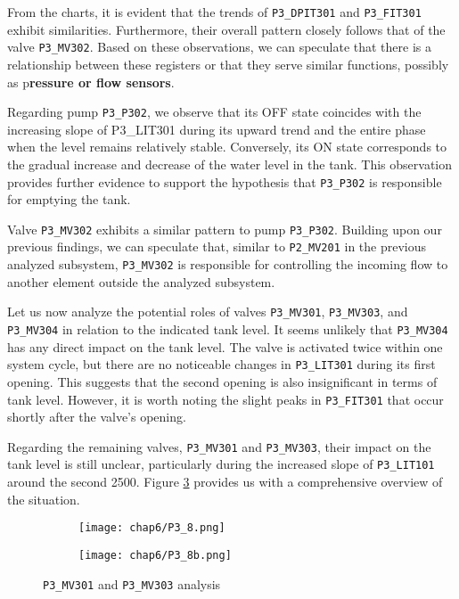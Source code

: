From the charts, it is evident that the trends of \texttt{P3\_DPIT301} and \texttt{P3\_FIT301} exhibit similarities. Furthermore, their overall pattern closely follows that of the valve \texttt{P3\_MV302}. Based on these observations, we can speculate that there is a relationship between these registers or that they serve similar functions, possibly as p\textbf{ressure or flow sensors}.

\bigskip
Regarding pump \texttt{P3\_P302}, we observe that its OFF state coincides with the increasing slope of P3\_LIT301 during its upward trend and the entire phase when the level remains relatively stable. Conversely, its ON state corresponds to the gradual increase and decrease of the water level in the tank. This observation provides further evidence to support the hypothesis that \texttt{P3\_P302} is responsible for emptying the tank.

Valve \texttt{P3\_MV302} exhibits a similar pattern to pump \texttt{P3\_P302}. Building upon our previous findings, we can speculate that, similar to \texttt{P2\_MV201} in the previous analyzed subsystem, \texttt{P3\_MV302} is responsible for controlling the incoming flow to another element outside the analyzed subsystem.

\bigskip
Let us now analyze the potential roles of valves \texttt{P3\_MV301}, \texttt{P3\_MV303}, and \texttt{P3\_MV304} in relation to the indicated tank level. It seems unlikely that \texttt{P3\_MV304} has any direct impact on the tank level. The valve is activated twice within one system cycle, but there are no noticeable changes in \texttt{P3\_LIT301} during its first opening. This suggests that the second opening is also insignificant in terms of tank level. However, it is worth noting the slight peaks in \texttt{P3\_FIT301} that occur shortly after the valve's opening.

Regarding the remaining valves, \texttt{P3\_MV301} and \texttt{P3\_MV303}, their impact on the tank level is still unclear, particularly during the increased slope of \texttt{P3\_LIT101} around the second 2500. Figure \ref{fig:6_graphs_P3_zoom}  provides us with a comprehensive overview of the situation.

\vfill
\pagebreak
\begin{figure}[H]
	\centering
	\begin{subfigure}{0.90\textwidth}
		\texttt{[image: chap6/P3\_8.png]}
		\caption{}
		\label{subfig:6_mv301}
	\end{subfigure}
	\begin{subfigure}{0.90\textwidth}
		\texttt{[image: chap6/P3\_8b.png]}
		\caption{}
		\label{subfig:6_mv301_zoom}
	\end{subfigure}
	\caption{\texttt{P3\_MV301} and \texttt{P3\_MV303} analysis}
	\label{fig:6_graphs_P3_zoom}
\end{figure}

